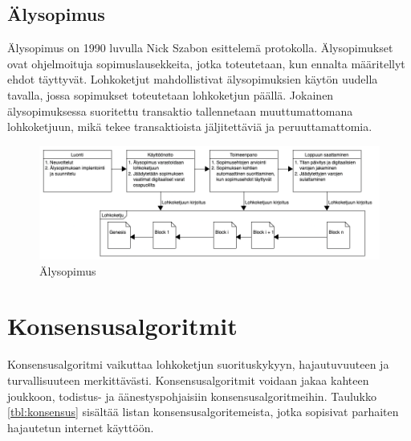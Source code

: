 \documentclass[utf8,bachelor]{gradu3}
\begin{document}
\section{Älysopimus}
Älysopimus on 1990 luvulla Nick Szabon esittelemä protokolla. Älysopimukset ovat ohjelmoituja sopimuslausekkeita, jotka toteutetaan, kun ennalta määritellyt ehdot täyttyvät.
Lohkoketjut mahdollistivat älysopimuksien käytön uudella tavalla, jossa sopimukset toteutetaan lohkoketjun päällä.
Jokainen älysopimuksessa suoritettu transaktio tallennetaan muuttumattomana lohkoketjuun, mikä tekee transaktioista jäljitettäviä ja peruuttamattomia. 



\begin{figure}[h]\centering
  \includegraphics[width=\textwidth,keepaspectratio]{aly}
  \caption[Älysopimuksen elinkaari]{Älysopimus}
  \label{fig:Sopimus}
\end{figure}

\chapter{Konsensusalgoritmit}\label{Konsensus}


Konsensusalgoritmi vaikuttaa lohkoketjun suorituskykyyn, hajautuvuuteen ja turvallisuuteen merkittävästi.
Konsensusalgoritmit voidaan jakaa kahteen joukkoon, todistus- ja äänestyspohjaisiin konsensusalgoritmeihin. 
Taulukko \ref{tbl:konsensus} sisältää listan konsensusalgoritemeista, jotka sopisivat parhaiten hajautetun internet käyttöön. 
\end{document}
